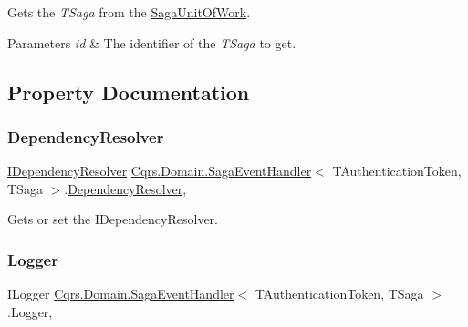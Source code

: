 Gets the {\itshape T\+Saga}  from the \hyperlink{classCqrs_1_1Domain_1_1SagaUnitOfWork}{Saga\+Unit\+Of\+Work}. 


\begin{DoxyParams}{Parameters}
{\em id} & The identifier of the {\itshape T\+Saga}  to get.\\
\hline
\end{DoxyParams}


\subsection{Property Documentation}
\mbox{\label{classCqrs_1_1Domain_1_1SagaEventHandler_ad7497b0e19703aa351e571427a072d0d_ad7497b0e19703aa351e571427a072d0d}} 
\subsubsection{\texorpdfstring{Dependency\+Resolver}{DependencyResolver}}
{\footnotesize\ttfamily \hyperlink{interfaceCqrs_1_1Configuration_1_1IDependencyResolver}{I\+Dependency\+Resolver} \hyperlink{classCqrs_1_1Domain_1_1SagaEventHandler}{Cqrs.\+Domain.\+Saga\+Event\+Handler}$<$ T\+Authentication\+Token, T\+Saga $>$.\hyperlink{classCqrs_1_1Configuration_1_1DependencyResolver}{Dependency\+Resolver}\hspace{0.3cm}{\ttfamily [get]}, {\ttfamily [protected]}}



Gets or set the I\+Dependency\+Resolver. 

\mbox{\label{classCqrs_1_1Domain_1_1SagaEventHandler_a06c2d4b3720bec78e9cea40cb0ed2ff3_a06c2d4b3720bec78e9cea40cb0ed2ff3}} 
\subsubsection{\texorpdfstring{Logger}{Logger}}
{\footnotesize\ttfamily I\+Logger \hyperlink{classCqrs_1_1Domain_1_1SagaEventHandler}{Cqrs.\+Domain.\+Saga\+Event\+Handler}$<$ T\+Authentication\+Token, T\+Saga $>$.Logger\hspace{0.3cm}{\ttfamily [get]}, {\ttfamily [protected]}}



